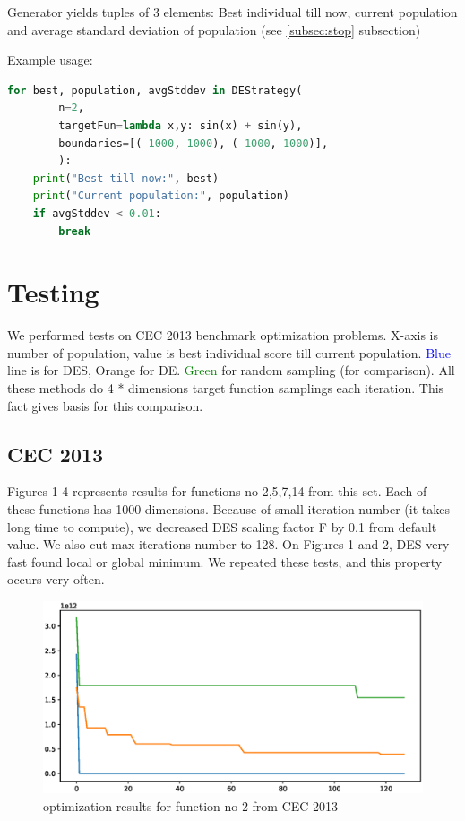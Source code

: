\documentclass[11pt,a4paper]{article}
\begin{document}
Generator yields tuples of 3 elements:
Best individual till now, current population and average standard deviation of population (see \ref{subsec:stop} subsection)

Example usage:
\begin{lstlisting}[language=Python]
for best, population, avgStddev in DEStrategy(
        n=2,
        targetFun=lambda x,y: sin(x) + sin(y),
        boundaries=[(-1000, 1000), (-1000, 1000)],
        ):
    print("Best till now:", best)
    print("Current population:", population)
    if avgStddev < 0.01:
        break
\end{lstlisting}


\section{Testing}\label{sec:testing}
We performed tests on CEC 2013 benchmark optimization problems.
X-axis is number of population, value is best individual score till current population.
\textcolor{blue}{Blue} line is for DES, \textcolor{oranger}{Orange} for DE. \textcolor{green}{Green} for random sampling (for comparison).
All these methods do 4 * dimensions target function samplings each iteration.
This fact gives basis for this comparison.

\subsection{CEC 2013}\label{subsec:cec_testing}

Figures 1-4 represents results for functions no 2,5,7,14 from this set.
Each of these functions has 1000 dimensions.
Because of small iteration number (it takes long time to compute), we decreased DES scaling factor F by 0.1 from default value.
We also cut max iterations number to 128.
On Figures 1 and 2, DES very fast found local or global minimum. We repeated these tests, and this property occurs very often.

\begin{figure}[H]
	\centering
	\includegraphics[scale=0.6]{cec2013_1.eps}
	\caption{optimization results for function no 2 from CEC 2013}
\end{figure}
\end{document}
